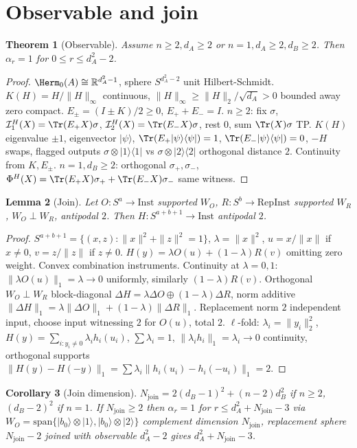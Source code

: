 \documentclass[11pt,a4paper]{article}
\newtheorem{theorem}{Theorem}[section]
\newtheorem{lemma}[theorem]{Lemma}
\newtheorem{corollary}[theorem]{Corollary}
\newcommand{\Inst}{\mathrm{Inst}}
\newcommand{\RepInst}{\mathrm{RepInst}}
\begin{document}
\section{Observable and join}
\begin{theorem}[Observable]
Assume $n\ge2,d_A\ge2$ or $n=1,d_A\ge2,d_B\ge2$. Then $\alpha_r=1$ for $0\le r\le d_A^2-2$.
\end{theorem}
\begin{proof}
$\Herm_0(A)\cong\mathbb R^{d_A^2-1}$, sphere $S^{d_A^2-2}$ unit Hilbert-Schmidt.
$K(H)=H/\|H\|_\infty$ continuous, $\|H\|_\infty\ge\|H\|_2/\sqrt{d_A}>0$ bounded away zero compact.
$E_\pm=(I\pm K)/2\ge0$, $E_++E_-=I$.
$n\ge2$: fix $\sigma$, $\mathcal I^H_1(X)=\Tr(E_+X)\sigma$, $\mathcal I^H_2(X)=\Tr(E_-X)\sigma$, rest $0$, sum $\Tr(X)\sigma$ TP.
$K(H)$ eigenvalue $\pm1$, eigenvector $|\psi\rangle$, $\Tr(E_+|\psi\rangle\langle\psi|)=1$, $\Tr(E_-|\psi\rangle\langle\psi|)=0$, $-H$ swaps, flagged outputs $\sigma\otimes|1\rangle\langle1|$ vs $\sigma\otimes|2\rangle\langle2|$ orthogonal distance $2$.
Continuity from $K,E_\pm$.
$n=1,d_B\ge2$: orthogonal $\sigma_+,\sigma_-$, $\Phi^H(X)=\Tr(E_+X)\sigma_++\Tr(E_-X)\sigma_-$ same witness.
\end{proof}
\begin{lemma}[Join]
Let $O:S^a\to\Inst$ supported $W_O$, $R:S^b\to\RepInst$ supported $W_R$, $W_O\perp W_R$, antipodal $2$. Then $H:S^{a+b+1}\to\Inst$ antipodal $2$.
\end{lemma}
\begin{proof}
$S^{a+b+1}=\{(x,z):\|x\|^2+\|z\|^2=1\}$, $\lambda=\|x\|^2$, $u=x/\|x\|$ if $x\neq0$, $v=z/\|z\|$ if $z\neq0$.
$H(y)=\lambda O(u)+(1-\lambda)R(v)$ omitting zero weight.
Convex combination instruments.
Continuity at $\lambda=0,1$: $\|\lambda O(u)\|_1=\lambda\to0$ uniformly, similarly $(1-\lambda)R(v)$.
Orthogonal $W_O\perp W_R$ block-diagonal $\Delta H=\lambda\Delta O\oplus(1-\lambda)\Delta R$, norm additive $\|\Delta H\|_1=\lambda\|\Delta O\|_1+(1-\lambda)\|\Delta R\|_1$.
Replacement norm $2$ independent input, choose input witnessing $2$ for $O(u)$, total $2$.
$\ell$-fold: $\lambda_i=\|y_i\|_2^2$, $H(y)=\sum_{i:y_i\neq0}\lambda_i h_i(u_i)$, $\sum\lambda_i=1$, $\|\lambda_i h_i\|_1=\lambda_i\to0$ continuity, orthogonal supports $\|H(y)-H(-y)\|_1=\sum\lambda_i\|h_i(u_i)-h_i(-u_i)\|_1=2$.
\end{proof}
\begin{corollary}[Join dimension]
$N_{\mathrm{join}}=2(d_B-1)^2+(n-2)d_B^2$ if $n\ge2$, $(d_B-2)^2$ if $n=1$. If $N_{\mathrm{join}}\ge2$ then $\alpha_r=1$ for $r\le d_A^2+N_{\mathrm{join}}-3$ via $W_O=\mathrm{span}\{|b_0\rangle\otimes|1\rangle,|b_0\rangle\otimes|2\rangle\}$ complement dimension $N_{\mathrm{join}}$, replacement sphere $N_{\mathrm{join}}-2$ joined with observable $d_A^2-2$ gives $d_A^2+N_{\mathrm{join}}-3$.
\end{corollary}
\end{document}
